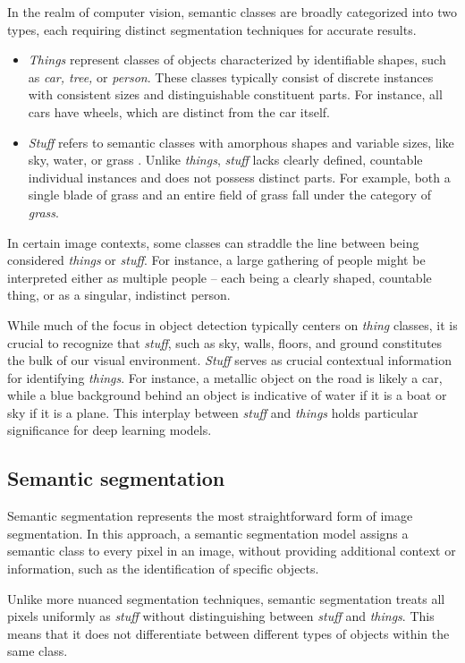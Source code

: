In the realm of computer vision, semantic classes are broadly categorized into two types, each requiring distinct segmentation techniques for accurate results.
\begin{itemize}
  \item \textit{Things} represent classes of objects characterized by identifiable shapes, such as \textit{car, tree,} or \textit{person}. These classes typically consist of discrete instances with consistent sizes and distinguishable constituent parts. For instance, all cars have wheels, which are distinct from the car itself.
  \item \textit{Stuff} refers to semantic classes with amorphous shapes and variable sizes, like sky, water, or grass
  . Unlike \textit{things}, \textit{stuff} lacks clearly defined, countable individual instances and does not possess distinct parts. For example, both a single blade of grass and an entire field of grass fall under the category of \textit{grass}.
\end{itemize}
In certain image contexts, some classes can straddle the line between being considered \textit{things} or \textit{stuff}. For instance, a large gathering of people might be interpreted either as multiple people -- each being a clearly shaped, countable thing, or as a singular, indistinct person.

While much of the focus in object detection typically centers on \textit{thing} classes, it is crucial to recognize that \textit{stuff}, such as sky, walls, floors, and ground constitutes the bulk of our visual environment. \textit{Stuff} serves as crucial contextual information for identifying \textit{things}. For instance, a metallic object on the road is likely a car, while a blue background behind an object is indicative of water if it is a boat or sky if it is a plane. This interplay between \textit{stuff} and \textit{things} holds particular significance for deep learning models.

  \subsection{Semantic segmentation}
Semantic segmentation represents the most straightforward form of image segmentation. In this approach, a semantic segmentation model assigns a semantic class to every pixel in an image, without providing additional context or information, such as the identification of specific objects.

Unlike more nuanced segmentation techniques, semantic segmentation treats all pixels uniformly as \textit{stuff} without distinguishing between \textit{stuff} and \textit{things}. This means that it does not differentiate between different types of objects within the same class.

